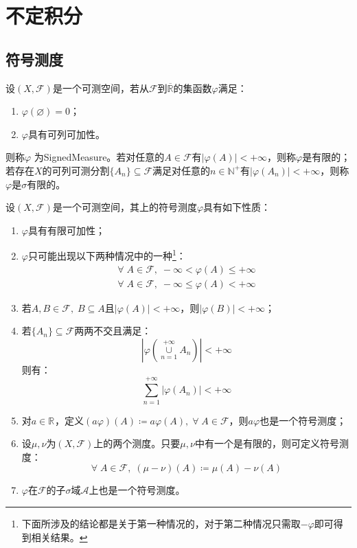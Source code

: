 \section{不定积分}

\subsection{符号测度}
\begin{definition}
	设$(X,\mathscr{F})$是一个可测空间，若从$\mathscr{F}$到$\overline{\mathbb{R}}$的集函数$\varphi$满足：
	\begin{enumerate}
		\item $\varphi(\varnothing)=0$；
		\item $\varphi$具有可列可加性。
	\end{enumerate}
	则称$\varphi$	为\gls{SignedMeasure}。若对任意的$A\in\mathscr{F}$有$|\varphi(A)|<+\infty$，则称$\varphi$是有限的；若存在$X$的可列可测分割$\{A_n\}\subseteq\mathscr{F}$满足对任意的$n\in\mathbb{N}^+$有$|\varphi(A_n)|<+\infty$，则称$\varphi$是$\sigma$有限的。
\end{definition}
\begin{property}\label{prop:SignedMeasure}
	设$(X,\mathscr{F})$是一个可测空间，其上的符号测度$\varphi$具有如下性质：
	\begin{enumerate}
		\item $\varphi$具有有限可加性；
		\item $\varphi$只可能出现以下两种情况中的一种\footnote{下面所涉及的结论都是关于第一种情况的，对于第二种情况只需取$-\varphi$即可得到相关结果。}：
		\begin{gather*}
			\forall\;A\in\mathscr{F},\;-\infty<\varphi(A)\leqslant+\infty \\
			\forall\;A\in\mathscr{F},\;-\infty\leqslant\varphi(A)<+\infty
		\end{gather*}
		\item 若$A,B\in\mathscr{F},\;B\subseteq A$且$|\varphi(A)|<+\infty$，则$|\varphi(B)|<+\infty$；
		\item 若$\{A_n\}\subseteq\mathscr{F}$两两不交且满足：
		\begin{equation*}
			\left|\varphi\left(\underset{n=1}{\overset{+\infty}{\cup}}A_n\right)\right|<+\infty
		\end{equation*}
		则有：
		\begin{equation*}
			\sum_{n=1}^{+\infty}|\varphi(A_n)|<+\infty
		\end{equation*}
		\item 对$a\in\mathbb{R}^{}$，定义$(a\varphi)(A)\coloneq a\varphi(A),\;\forall\;A\in\mathscr{F}$，则$a\varphi$也是一个符号测度；
		\item 设$\mu,\nu$为$(X,\mathscr{F})$上的两个测度。只要$\mu,\nu$中有一个是有限的，则可定义符号测度：
		\begin{equation*}
			\forall\;A\in\mathscr{F},\;(\mu-\nu)(A)\coloneq\mu(A)-\nu(A)
		\end{equation*}
		\item $\varphi$在$\mathscr{F}$的子$\sigma$域$\mathscr{A}$上也是一个符号测度。
	\end{enumerate}
\end{property}

